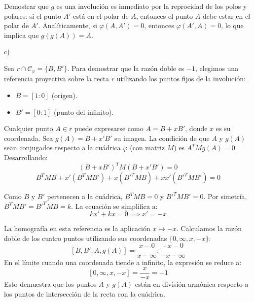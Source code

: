 {Demostrar que $g$ es una involución es inmediato por la reprocidad de los polos y polares: si el punto $A'$ está en el polar de $A$, entonces el punto $A$ debe estar en el polar de $A'$. Analíticamente, si $\varphi(A, A') = 0$, entonces $\varphi(A', A) = 0$, lo que implica que $g(g(A)) = A$.

c) 

Sea $r \cap \mathcal{C}_\varphi = \{B, B'\}$. Para demostrar que la razón doble es $-1$, elegimos una referencia proyectiva sobre la recta $r$ utilizando los puntos fijos de la involución:
\begin{itemize}
    \item $B = [1:0]$ (origen).
    \item $B' = [0:1]$ (punto del infinito).
\end{itemize}

Cualquier punto $A \in r$ puede expresarse como $A = B + x B'$, donde $x$ es su coordenada. Sea $g(A) = B + x' B'$ su imagen. La condición de que $A$ y $g(A)$ sean conjugados respecto a la cuádrica $\varphi$ (con matriz $M$) es $A^T M g(A) = 0$. Desarrollando:
\[ (B + xB')^T M (B + x'B') = 0 \]
\[ B^T MB + x'(B^T MB') + x(B'^T MB) + xx'(B'^T MB') = 0 \]

Como $B$ y $B'$ pertenecen a la cuádrica, $B^T MB = 0$ y $B'^T MB' = 0$. Por simetría, $B^T MB' = B'^T MB = k$. La ecuación se simplifica a:
\[ kx' + kx = 0 \implies x' = -x \]

La homografía en esta referencia es la aplicación $x \mapsto -x$. Calculamos la razón doble de los cuatro puntos utilizando sus coordenadas $\{0, \infty, x, -x\}$:
\[ [B, B', A, g(A)] = \frac{x - 0}{x - \infty} : \frac{-x - 0}{-x - \infty} \]
En el límite cuando una coordenada tiende a infinito, la expresión se reduce a:
\[ [0, \infty, x, -x] = \frac{x}{-x} = -1 \]
Esto demuestra que los puntos $A$ y $g(A)$ están en división armónica respecto a los puntos de intersección de la recta con la cuádrica.
}


